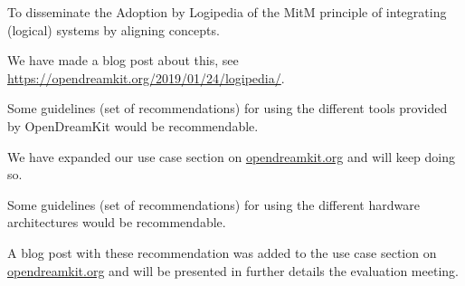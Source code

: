 \begin{recommendation}
  To disseminate the Adoption by Logipedia of the MitM principle of
  integrating (logical) systems by aligning concepts.
\end{recommendation}
We have made a blog post about this, see \url{https://opendreamkit.org/2019/01/24/logipedia/}.

\begin{recommendation}
  Some guidelines (set of recommendations) for using the different
  tools provided by OpenDreamKit would be recommendable.
\end{recommendation}
We have expanded our use case section on \url{opendreamkit.org} and
will keep doing so.


\begin{recommendation}
  Some guidelines (set of recommendations) for using the different
  hardware architectures would be recommendable.
\end{recommendation}
 A blog post with these recommendation was added to the use case section on \url{opendreamkit.org} and will be
 presented in further details the evaluation meeting.


